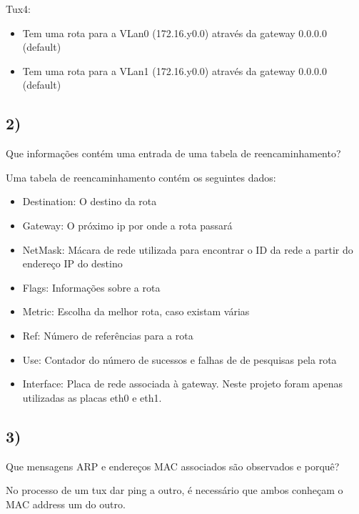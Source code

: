 \documentclass[11pt]{article}
\begin{document}
Tux4:
\begin{itemize}
\item Tem uma rota para a VLan0 (172.16.y0.0) através da gateway 0.0.0.0 (default)
\item Tem uma rota para a VLan1 (172.16.y0.0) através da gateway 0.0.0.0 (default)
	
\end{itemize}


\subsection{2)} Que informações contém uma entrada de uma tabela de reencaminhamento?

Uma tabela de reencaminhamento contém os seguintes dados:

\begin{itemize}

\item Destination: O destino da rota

\item Gateway: O próximo ip por onde a rota passará

\item NetMask: Mácara de rede utilizada para encontrar o ID da rede a partir do endereço IP do destino

\item Flags: Informações sobre a rota

\item Metric: Escolha da melhor rota, caso existam várias

\item Ref: Número de referências para a rota

\item Use: Contador do número de sucessos e falhas de de pesquisas pela rota

\item Interface: Placa de rede associada à gateway. Neste projeto foram apenas utilizadas as placas eth0 e eth1.

\end{itemize}

\subsection{3)} Que mensagens ARP e endereços MAC associados são observados e porquê?

No processo de um tux dar ping a outro, é necessário que ambos conheçam o MAC address um do outro.
\end{document}
